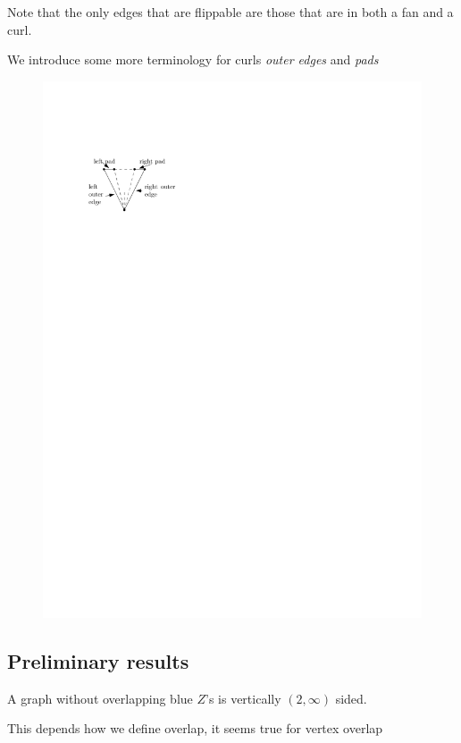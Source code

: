 Note that the only edges that are flippable are those that are in both a fan and a curl.


We introduce some more terminology for curls \emph{outer edges} and \emph{pads}
\begin{figure}[h]
  \centering
  \includegraphics[scale=1]{unifiedAlgo/img/curlterms}
  \caption{}
  \label{fig:}
\end{figure}


\subsection{Preliminary results}

\begin{lemma}
  \label{lm:}
  A graph without overlapping blue $Z$'s is vertically $(2, \infty)$ sided.
\end{lemma}
This depends how we define overlap, it seems true for vertex overlap

